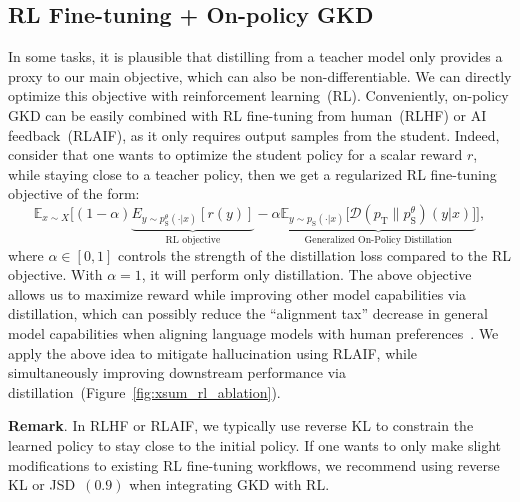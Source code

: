 \documentclass{article} %
\newcommand{\E}{\mathbb{E}}
\def\D{\mathcal{D}}
\newcommand{\stu}[0]{p_{\text{S}}}
\newcommand{\tea}[0]{p_{\text{T}}}
\begin{document}
\subsection{RL Fine-tuning + On-policy GKD}
\label{sec:rl_gkd}
In some tasks, it is plausible that distilling from a teacher model only provides a proxy to our main objective, which can also be non-differentiable. We can directly optimize this objective with reinforcement learning~(RL). Conveniently, on-policy GKD can be easily combined with RL fine-tuning from human~(RLHF) or AI feedback~(RLAIF), as it only requires output samples from the student. Indeed, consider that one wants to optimize the student policy for a scalar reward $r$, while staying close to a teacher policy, then we get a regularized RL fine-tuning objective of the form:
\begin{equation}
     \E_{x\sim X} \Big[(1-\alpha) \underbrace{E_{y \sim \stu^\theta(\cdot|x)} \left[r(y)\right]}_{\text{RL objective}} - \alpha \underbrace{\E_{y \sim \stu(\cdot|x)} \big[\D(\tea \| \stu^\theta)(y|x)\big]}_{\text{Generalized On-Policy Distillation}} \Big],
     \label{eq:rl_with_gkd}
\end{equation}
where $\alpha \in [0, 1]$ controls the strength of the distillation loss compared to the RL objective. With $\alpha=1$, it will perform only distillation.  The above objective allows us to maximize reward while improving other model capabilities via distillation, which can possibly reduce the ``alignment tax'' decrease in general model capabilities when aligning language models with human preferences~\citep{ouyang2022training}. We apply the above idea to mitigate hallucination using RLAIF, while simultaneously improving downstream performance via distillation~(Figure~\ref{fig:xsum_rl_ablation}).

\textbf{Remark}. In RLHF or RLAIF, we typically use reverse KL to constrain the learned policy to stay close to the initial policy. If one wants to only make slight modifications to existing RL fine-tuning workflows, we recommend using reverse KL or JSD~$(0.9)$ when integrating GKD with RL. 

\end{document}
